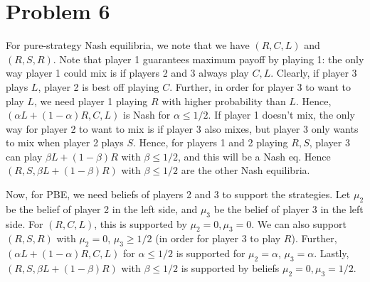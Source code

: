 \documentclass[10pt,letter]{article}
\begin{document}
\section*{Problem 6}
For pure-strategy Nash equilibria, we note that we have $(R, C, L)$ and $(R, S, R)$. Note that player 1 guarantees maximum payoff by playing 1: the only way player 1 could mix is if players 2 and 3 always play $C, L$. Clearly, if player 3 plays $L$, player 2 is best off playing $C$. Further, in order for player 3 to want to play $L$, we need player 1 playing $R$ with higher probability than $L$. Hence, $(\alpha L + (1-\alpha) R, C, L)$ is Nash for $\alpha \le 1/2$. If player 1 doesn't mix, the only way for player 2 to want to mix is if player 3 also mixes, but player 3 only wants to mix when player 2 plays $S$. Hence, for players 1 and 2 playing $R, S$, player 3 can play $\beta L + (1-\beta)R$ with $\beta \le 1/2$, and this will be a Nash eq.
Hence $(R, S, \beta L + (1-\beta)R)$ with $\beta \le 1/2$ are the other Nash equilibria.

Now, for PBE, we need beliefs of players 2 and 3 to support the strategies. Let $\mu_2$ be the belief of player 2 in the left side, and $\mu_3$ be the belief of player 3 in the left side. For $(R,C,L)$, this is supported by $\mu_2 = 0, \mu_3 = 0$. We can also support $(R,S,R)$ with $\mu_2 = 0$, $\mu_3 \ge 1/2$ (in order for player 3 to play $R$).
Further, $(\alpha L + (1-\alpha) R, C, L)$ for $\alpha \le 1/2$ is supported for $\mu_2 = \alpha$, $\mu_3 = \alpha$. Lastly, $(R, S, \beta L + (1-\beta)R)$ with $\beta \le 1/2$ is supported by beliefs $\mu_2 = 0, \mu_3 = 1/2$.
\end{document}
